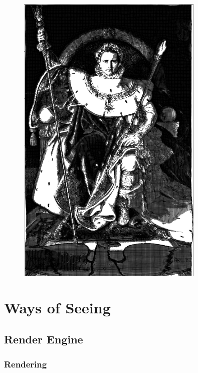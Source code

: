 \documentclass[12pt]{book}
\begin{document}
\begin{figure}
        \centering
        \includegraphics[width=0.8\textwidth]{figures/ofig/napolean_nice_render.jpg}
    \end{figure}


\chapter{Ways of Seeing}


\section{Render Engine}
\subsection{Rendering}
\inputminted{python}{rendering/shading/grid.py}
\inputminted{python}{rendering/shading/masking.py}
\inputminted{python}{rendering/shading/simple_shapes.py}
\end{document}
